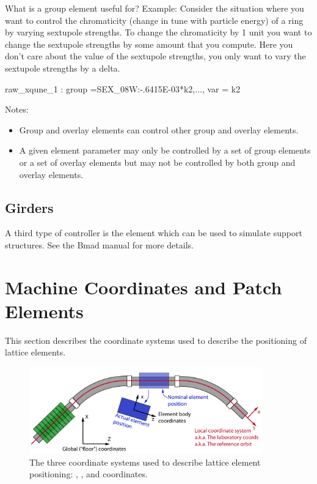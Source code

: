 \documentclass{hitec}
\newcommand{\Section}[1]{\section{#1}\vspace*{-1ex}}
\begin{document}
What is a group element useful for? Example: Consider the situation where you want to control the
chromaticity (change in tune with particle energy) of a ring by varying sextupole strengths. To
change the chromaticity by 1 unit you want to change the sextupole strengths by some amount that you
compute. Here you don't care about the value of the sextupole strengths, you only want to vary the
sextupole strengths by a delta.

{\small
\begin{code} 
raw_xqune_1 : group ={SEX_08W:-.6415E-03*k2,...}, var = {k2}
\end{code}}

Notes:
\begin{itemize}
\item
Group and overlay elements can control other group and overlay elements.
\item
A given element parameter may only be controlled by a set of group elements or a set of overlay
elements but may not be controlled by both group and overlay elements.
\end{itemize}

\subsection{Girders}

A third type of controller is the  element which can be used to simulate support
structures. See the Bmad manual for more details.

\newpage

\Section{Machine Coordinates and Patch Elements}

This section describes the coordinate systems used to describe the positioning
of lattice elements.

\begin{figure}[tb]
  \centering
  \includegraphics[width=0.9\textwidth]{coordinates.pdf}
  \caption{The three coordinate systems used to describe lattice element positioning:
, , and  coordinates.}
  \label{f:coordinates}
\end{figure}
\end{document}
